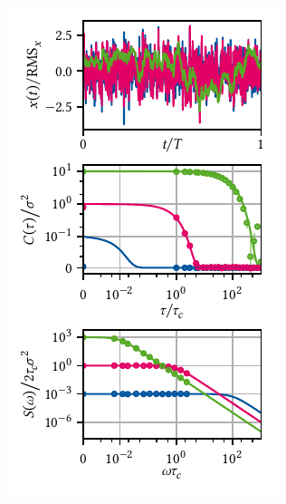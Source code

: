 \begin{marginfigure}[*-6]
    \centering
    \includegraphics{img/pdf/spectrometer/lorentzian_psdcorr}
    \caption[]{
        Ornstein-Uhlenbeck process.
        Simulated time traces, autocorrelation function, and \gls{psd} of the Ornstein-Uhlenbeck process.
        Top: Simulated time traces using the algorithm presented in \cref{sec:app:ff:time_domain_methods}.
        The data are normalized to the computed \gls{rms} (equal to $\sigma$ in the continuous case).
        Middle: Theoretical autocorrelation function (\cref{eq:speck:ou:autocorrelation}, solid lines) computed from the simulated data averaged over \num{e3} traces (circles, subset of points).
        Error bars indicate the standard error of the mean, axes are scaled with respect to the parameters of the magenta data, and data are plotted on an $\asinh$-scale.
        Bottom: Theoretical \gls{psd} (\cref{eq:speck:ou:psd}, solid lines) and periodograms computed from the simulated data using , \cf \cref{eq:speck:periodogram}, averaged over \num{e3} traces (circles, subset of points).
        Axes are again scaled with respect to the parameters of the magenta data and plotted on an $\asinh$-scale.
        Parameters are $\tau_c = \dt\times\{\num{e-2},\num{e0},\num{e2}\}$ and $\sigma^2=\sqrt{\tau_c}/4$ for blue, magenta, and green data, respectively.
    }
    \label{fig:speck:psdcorr}
\end{marginfigure}

